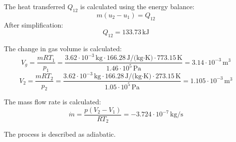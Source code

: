 The heat transferred \( Q_{12} \) is calculated using the energy balance:  
\[
m (u_2 - u_1) = Q_{12}
\]  
After simplification:  
\[
Q_{12} = 133.73 \, \text{kJ}
\]  

The change in gas volume is calculated:  
\[
V_g = \frac{m R T_1}{p_1} = \frac{3.62 \cdot 10^{-3} \, \text{kg} \cdot 166.28 \, \text{J/(kg·K)} \cdot 773.15 \, \text{K}}{1.46 \cdot 10^5 \, \text{Pa}} = 3.14 \cdot 10^{-3} \, \text{m}^3
\]  
\[
V_2 = \frac{m R T_2}{p_2} = \frac{3.62 \cdot 10^{-3} \, \text{kg} \cdot 166.28 \, \text{J/(kg·K)} \cdot 273.15 \, \text{K}}{1.05 \cdot 10^5 \, \text{Pa}} = 1.105 \cdot 10^{-3} \, \text{m}^3
\]  

The mass flow rate is calculated:  
\[
\dot{m} = \frac{p (V_2 - V_1)}{R T_2} = -3.724 \cdot 10^{-7} \, \text{kg/s}
\]  

The process is described as adiabatic.